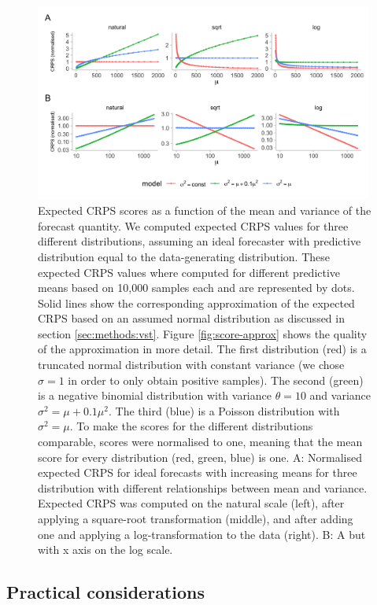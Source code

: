 \documentclass{article}
\begin{document}
\begin{figure}[h!]
    \centering
    \includegraphics[width=0.99\textwidth]{output/figures/SIM-mean-state-size.png}
    \caption{Expected CRPS scores as a function of the mean and variance of the forecast quantity. We computed expected CRPS values  for three different distributions, assuming an ideal forecaster with predictive distribution equal to the data-generating distribution. 
    These expected CRPS values where computed for different predictive means based on 10,000 samples each and are represented by dots. Solid lines show the corresponding approximation of the expected CRPS based on an assumed normal distribution as discussed in section \ref{sec:methods:vst}. Figure \ref{fig:score-approx} shows the quality of the approximation in more detail. 
    The first distribution (red) is a truncated normal distribution with constant variance (we chose $\sigma = 1$ in order to only obtain positive samples). The second (green) is a negative binomial distribution with variance $\theta = 10$ and variance $\sigma^2 = \mu + 0.1\mu^2$. The third (blue) is a
    Poisson distribution with $\sigma^2 = \mu$. To make the scores for the different distributions comparable, scores were normalised to one, meaning that the mean score for every distribution (red, green, blue) is one. 
    A: Normalised expected CRPS for ideal forecasts with increasing means for three distribution with different relationships between mean and variance. Expected CRPS was computed on the natural scale (left), after applying a square-root transformation (middle), and after adding one and applying a log-transformation to the data (right). B: A but with x axis on the log scale.}
    \label{fig:SIM-wis-state-size-mean}
\end{figure}

\subsection{Practical considerations}
\label{sec:methods:considerations}
\end{document}
